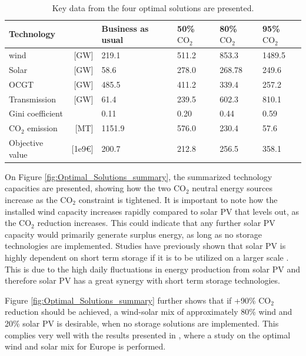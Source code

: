 \begin{table}[h]
	\begin{tabular}{lr|llll}
		Technology      & & Business as usual & 50\% $\text{CO}_2$  & 80\% $\text{CO}_2$  & 95\% $\text{CO}_2$  \\ \hline
		wind &[GW] & 219.1 & 511.2 & 853.3 & 1489.5 \\
		Solar &[GW]& 58.6 & 278.0 & 268.78 & 249.6 \\
		OCGT &[GW]& 485.5 & 411.2 & 339.4 & 257.2 \\
		Transmission &[GW]& 61.4 & 239.5 & 602.3 & 810.1 \\
		Gini coefficient & & 0.11 & 0.20 & 0.44 & 0.59 \\
		$\text{CO}_2$ emission &[MT] & 1151.9 & 576.0 & 230.4 & 57.6 \\
		Objective value &[1e9\euro] & 200.7 & 212.8 & 256.5 & 358.1 \\         
	\end{tabular}
	\caption{Key data from the four optimal solutions are presented.}
	\label{tab:Optimal_Solutions_summary}
\end{table}

On Figure \ref{fig:Optimal_Solutions_summary}, the summarized technology capacities are presented, showing how the two $\text{CO}_2$ neutral energy sources increase as the $\text{CO}_2$ constraint is tightened. It is important to note how the installed wind capacity increases rapidly compared to solar PV that levels out, as the $\text{CO}_2$ reduction increases. This could indicate that any further solar PV capacity would primarily generate surplus energy, as long as no storage technologies are implemented. Studies have previously shown that solar PV is highly dependent on short term storage if it is to be utilized on a larger scale \cite{rasmussen2011a} \cite{VICTORIA2019111977}. This is due to the high daily fluctuations in energy production from solar PV and therefore solar PV has a great synergy with short term storage technologies. 

Figure \ref{fig:Optimal_Solutions_summary} further shows that if +90\% $\text{CO}_2$ reduction should be achieved, a wind-solar mix of approximately 80\% wind and 20\% solar PV is desirable, when no storage solutions are implemented. This complies very well with the results presented in \cite{rasmussen2011a}, where a study on the optimal wind and solar mix for Europe is performed. 

